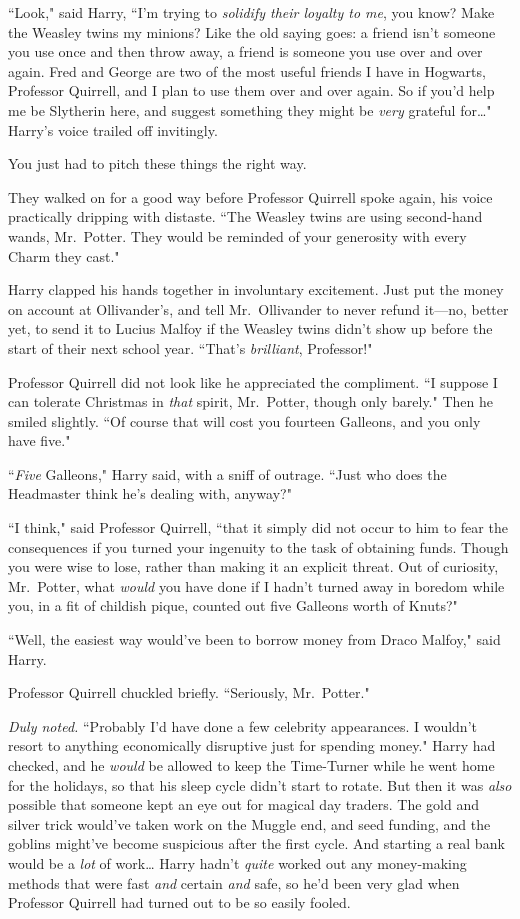 ``Look," said Harry, ``I'm trying to \emph{solidify their loyalty to me}, you know? Make the Weasley twins my minions? Like the old saying goes: a friend isn't someone you use once and then throw away, a friend is someone you use over and over again. Fred and George are two of the most useful friends I have in Hogwarts, Professor Quirrell, and I plan to use them over and over again. So if you'd help me be Slytherin here, and suggest something they might be \emph{very} grateful for{\ldots}" Harry's voice trailed off invitingly.

You just had to pitch these things the right way.

They walked on for a good way before Professor Quirrell spoke again, his voice practically dripping with distaste. ``The Weasley twins are using second-hand wands, Mr.~Potter. They would be reminded of your generosity with every Charm they cast."

Harry clapped his hands together in involuntary excitement. Just put the money on account at Ollivander's, and tell Mr.~Ollivander to never refund it—no, better yet, to send it to Lucius Malfoy if the Weasley twins didn't show up before the start of their next school year. ``That's \emph{brilliant}, Professor!"

Professor Quirrell did not look like he appreciated the compliment. ``I suppose I can tolerate Christmas in \emph{that} spirit, Mr.~Potter, though only barely." Then he smiled slightly. ``Of course that will cost you fourteen Galleons, and you only have five."

``\emph{Five} Galleons," Harry said, with a sniff of outrage. ``Just who does the Headmaster think he's dealing with, anyway?"

``I think," said Professor Quirrell, ``that it simply did not occur to him to fear the consequences if you turned your ingenuity to the task of obtaining funds. Though you were wise to lose, rather than making it an explicit threat. Out of curiosity, Mr.~Potter, what \emph{would} you have done if I hadn't turned away in boredom while you, in a fit of childish pique, counted out five Galleons worth of Knuts?"

``Well, the easiest way would've been to borrow money from Draco Malfoy," said Harry.

Professor Quirrell chuckled briefly. ``Seriously, Mr.~Potter."

\emph{Duly noted.} ``Probably I'd have done a few celebrity appearances. I wouldn't resort to anything economically disruptive just for spending money." Harry had checked, and he \emph{would} be allowed to keep the Time-Turner while he went home for the holidays, so that his sleep cycle didn't start to rotate. But then it was \emph{also} possible that someone kept an eye out for magical day traders. The gold and silver trick would've taken work on the Muggle end, and seed funding, and the goblins might've become suspicious after the first cycle. And starting a real bank would be a \emph{lot} of work{\ldots} Harry hadn't \emph{quite} worked out any money-making methods that were fast \emph{and} certain \emph{and} safe, so he'd been very glad when Professor Quirrell had turned out to be so easily fooled.

